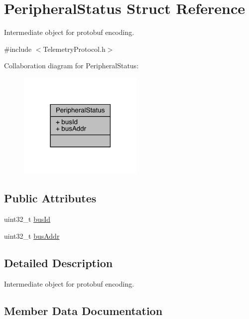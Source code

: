 \hypertarget{struct_peripheral_status}{}\section{Peripheral\+Status Struct Reference}
\label{struct_peripheral_status}


Intermediate object for protobuf encoding.  




{\ttfamily \#include $<$Telemetry\+Protocol.\+h$>$}



Collaboration diagram for Peripheral\+Status\+:\nopagebreak
\begin{figure}[H]
\begin{center}
\leavevmode
\includegraphics[width=170pt]{struct_peripheral_status__coll__graph}
\end{center}
\end{figure}
\subsection*{Public Attributes}
\begin{DoxyCompactItemize}
\item 
uint32\+\_\+t \mbox{\hyperlink{struct_peripheral_status_ad1d03bec7b4820fa7089ea59a61aa228}{bus\+Id}}
\item 
uint32\+\_\+t \mbox{\hyperlink{struct_peripheral_status_a02166b3f172d25857ce1e00a2c05ba7b}{bus\+Addr}}
\end{DoxyCompactItemize}


\subsection{Detailed Description}
Intermediate object for protobuf encoding. 

\subsection{Member Data Documentation}
\mbox{\label{struct_peripheral_status_a02166b3f172d25857ce1e00a2c05ba7b}} 
